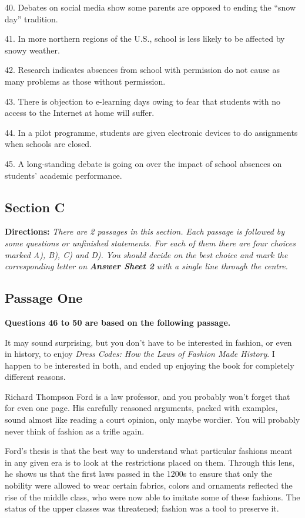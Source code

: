 \documentclass[UTF8,11pt]{ctexart}
\begin{document}
40. Debates on social media show some parents are opposed to ending the “snow day” tradition.


41. In more northern regions of the U.S., school is less likely to be affected by snowy weather.


42. Research indicates absences from school with permission do not cause as many problems as those without permission.


43. There is objection to e-learning days owing to fear that students with no access to the Internet at home will suffer.


44. In a pilot programme, students are given electronic devices to do assignments when schools are closed.


45. A long-standing debate is going on over the impact of school absences on students’ academic performance.


\subsection*{\textbf{Section C}}


\textbf{Directions: }\textit{There are 2 passages in this section. Each passage is followed by some questions or unfinished} \textit{statements. For each of them there are four choices marked A), B), C) and D). You should decide on the best} \textit{choice and mark the corresponding letter on }\textbf{\textit{Answer Sheet 2}}\textit{ with a single line through the centre.}


\subsection*{\textbf{Passage One}}


\textbf{Questions 46 to 50 are based on the following passage.}


It may sound surprising, but you don’t have to be interested in fashion, or even in history, to enjoy \textit{Dress} \textit{Codes: How the Laws of Fashion Made History}. I happen to be interested in both, and ended up enjoying the book for completely different reasons.


Richard Thompson Ford is a law professor, and you probably won’t forget that for even one page. His carefully reasoned arguments, packed with examples, sound almost like reading a court opinion, only maybe wordier. You will probably never think of fashion as a trifle again.


Ford’s thesis is that the best way to understand what particular fashions meant in any given era is to look at the restrictions placed on them. Through this lens, he shows us that the first laws passed in the 1200s to ensure that only the nobility were allowed to wear certain fabrics, colors and ornaments reflected the rise of the middle class, who were now able to imitate some of these fashions. The status of the upper classes was threatened; fashion was a tool to preserve it.
\end{document}
